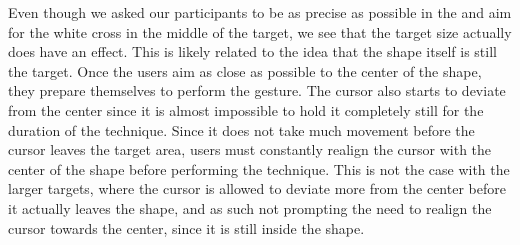 Even though we asked our participants to be as precise as possible in the \accuracy and aim for the white cross in the middle of the target, we see that the target size actually does have an effect.
This is likely related to the idea that the shape itself is still the target. 
Once the users aim as close as possible to the center of the shape, they prepare themselves to perform the gesture. 
The cursor also starts to deviate from the center since it is almost impossible to hold it completely still for the duration of the technique.
Since it does not take much movement before the cursor leaves the target area, users must constantly realign the cursor with the center of the shape before performing the technique.
This is not the case with the larger targets, where the cursor is allowed to deviate more from the center before it actually leaves the shape, and as such not prompting the need to realign the cursor towards the center, since it is still inside the shape. 
